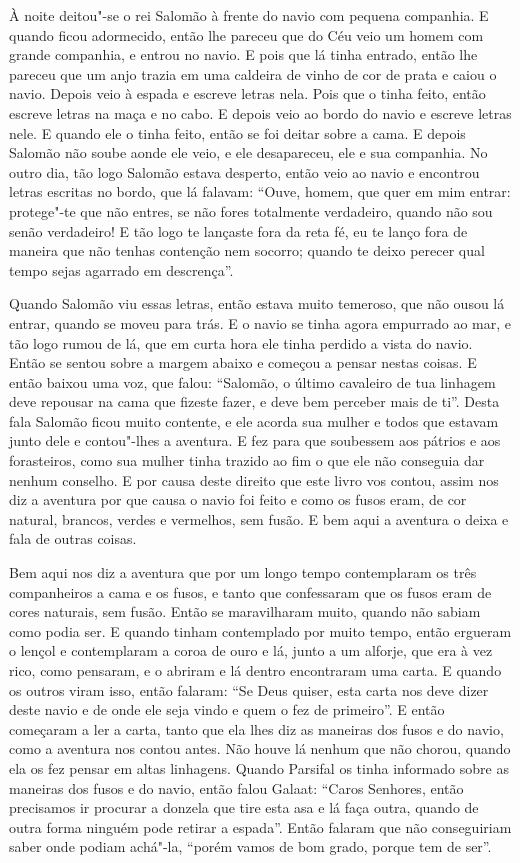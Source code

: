 À noite deitou"-se o rei Salomão à frente do navio com pequena companhia. E
quando ficou adormecido, então lhe pareceu que do Céu veio um homem com grande
companhia, e entrou no navio. E pois que lá tinha entrado, então lhe pareceu
que um anjo trazia em  uma caldeira de vinho de cor de prata e caiou o navio.
Depois veio à espada e escreve letras nela. Pois que o tinha feito, então
escreve letras na maça e no cabo. E depois veio ao bordo do navio e escreve
letras nele. E quando ele o tinha feito, então se foi deitar sobre a cama. E
depois Salomão não soube aonde ele veio, e ele desapareceu, ele e sua companhia. 
No outro dia, tão logo Salomão estava desperto, então veio ao navio e
encontrou letras escritas no bordo, que lá falavam: ``Ouve, homem, que quer em
mim entrar: protege"-te que não entres, se não fores totalmente verdadeiro,
quando não sou senão verdadeiro! E tão logo te lançaste fora da reta fé, eu te
lanço fora de maneira que não tenhas contenção nem socorro; quando te deixo
perecer qual tempo sejas agarrado em descrença”.

Quando Salomão viu essas letras, então estava muito temeroso, que não ousou lá
entrar, quando se moveu para trás. E o navio se tinha agora empurrado ao mar, e
tão logo rumou de lá, que em curta hora ele tinha perdido a vista do navio.
Então se sentou sobre a margem abaixo e começou a pensar nestas coisas. E então
baixou uma voz, que falou: “Salomão, o último cavaleiro de tua linhagem deve
repousar na cama que fizeste fazer, e deve bem perceber mais de ti”.
Desta fala Salomão ficou muito contente, e ele acorda sua mulher e todos que
estavam junto dele e contou"-lhes a aventura. E fez para que soubessem aos
pátrios e aos forasteiros, como sua mulher tinha trazido ao fim o que ele não
conseguia dar nenhum conselho. E por causa deste direito que este livro vos
contou, assim nos diz a aventura por que causa o navio foi feito e como os
fusos eram, de cor natural, brancos, verdes e vermelhos, sem fusão. E bem aqui
a aventura o deixa e fala de outras coisas.

Bem aqui nos diz a aventura que por um longo tempo contemplaram os três
companheiros a cama e os fusos, e tanto que confessaram que os fusos eram de
cores naturais, sem fusão. Então se maravilharam muito, quando não sabiam como
podia ser. E quando tinham contemplado por muito tempo, então ergueram o lençol
e contemplaram a coroa de ouro e lá, junto a um alforje, que era à vez rico,
como pensaram, e o abriram e lá dentro encontraram uma carta. E quando os
outros viram isso, então falaram: “Se Deus quiser, esta carta nos deve dizer
deste navio e de onde ele seja vindo e quem o fez de primeiro”. E então
começaram a ler a carta, tanto que ela lhes diz as maneiras dos fusos e do
navio, como a aventura nos contou antes. Não houve lá nenhum que não chorou,
quando ela os fez pensar em altas linhagens. Quando Parsifal os tinha
informado sobre as maneiras dos fusos e do navio, então falou Galaat: “Caros
Senhores, então precisamos ir procurar a donzela que tire esta asa e lá faça
outra, quando de outra forma ninguém pode retirar a espada”. Então falaram que
não conseguiriam saber onde podiam achá"-la, “porém vamos de bom grado, porque
tem de ser”.


